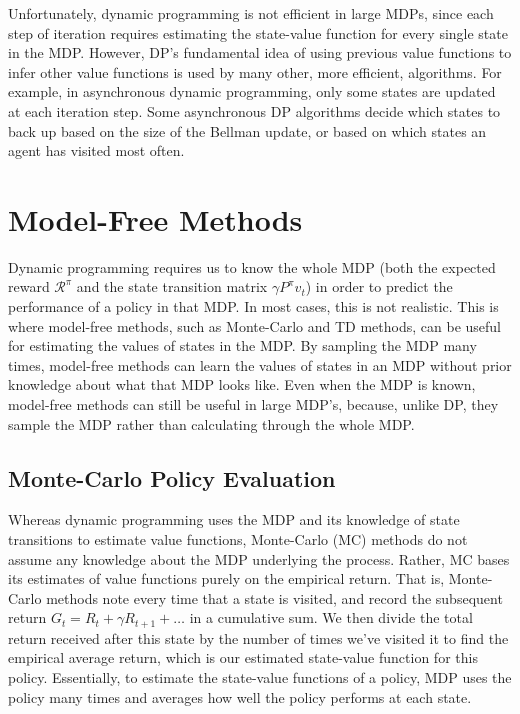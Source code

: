 \documentclass{article}
\begin{document}
Unfortunately, dynamic programming is not efficient in large MDPs, since each step of iteration requires estimating the state-value function for every single state in the MDP. However, DP's fundamental idea of using previous value functions to infer other value functions is used by many other, more efficient, algorithms. For example, in asynchronous dynamic programming, only some states are updated at each iteration step. Some asynchronous DP algorithms decide which states to back up based on the size of the Bellman update, or based on which states an agent has visited most often.

\section{Model-Free Methods}

Dynamic programming requires us to know the whole MDP (both the expected reward $\mathcal{R}^\pi$ and the state transition matrix $\gamma P^\pi v_t$) in order to predict the performance of a policy in that MDP. In most cases, this is not realistic. This is where model-free methods, such as Monte-Carlo and TD methods, can be useful for estimating the values of states in the MDP. By sampling the MDP many times, model-free methods can learn the values of states in an MDP without prior knowledge about what that MDP looks like. Even when the MDP is known, model-free methods can still be useful in large MDP's, because, unlike DP, they sample the MDP rather than calculating through the whole MDP.

\subsection{Monte-Carlo Policy Evaluation}

Whereas dynamic programming uses the MDP and its knowledge of state transitions to estimate value functions, Monte-Carlo (MC) methods do not assume any knowledge about the MDP underlying the process. Rather, MC bases its estimates of value functions purely on the empirical return. That is, Monte-Carlo methods note every time that a state is visited, and record the subsequent return $G_t = R_t + \gamma R_{t+1} + \ldots$ in a cumulative sum. We then divide the total return received after this state by the number of times we've visited it to find the empirical average return, which is our estimated state-value function for this policy. Essentially, to estimate the state-value functions of a policy, MDP uses the policy many times and averages how well the policy performs at each state. 
\end{document}
